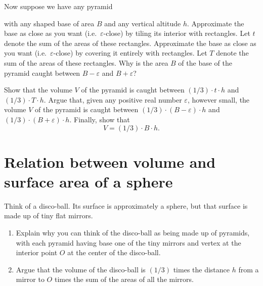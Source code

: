 \documentclass[newpage,hints,handout]{ximera}
\begin{document}
Now suppose we have any pyramid%
\begin{image}
\end{image}
with any shaped base of area $B$ and any vertical altitude $h$. Approximate
the base as close as you want (i.e.\ $\varepsilon$-close) by tiling its interior
with rectangles. Let $t$ denote the sum of the areas of these rectangles.
Approximate the base as close as you want (i.e.\ $\varepsilon$-close) by
covering it entirely with rectangles. Let $T$ denote the sum of the areas of
these rectangles. Why is the area $B$ of the base of the pyramid caught
between $B-\varepsilon$ and $B+\varepsilon$?

\begin{problem}
Show that the volume $V$ of the pyramid is caught between $\left(
1/3\right) \cdot t\cdot h$ and $\left( 1/3\right) \cdot T\cdot
h$. Argue that, given any positive real number $\varepsilon$, however
small, the volume $V$ of the pyramid is caught between $\left(
1/3\right) \cdot \left( B-\varepsilon\right)\cdot h$ and $\left(
1/3\right) \cdot \left( B+\varepsilon\right) \cdot h$. Finally, show that
\[
V=\left(  1/3\right)  \cdot B\cdot h.
\]
\end{problem}

\section{Relation between volume and surface area of a sphere}

Think of a disco-ball. Its surface is approximately a sphere, but that
surface is made up of tiny flat mirrors.

\begin{problem}\hfil
\begin{enumerate}
\item Explain why you can think of the disco-ball as being made up of
  pyramids, with each pyramid having base one of the tiny mirrors and
  vertex at the interior point $O$ at the center of the disco-ball.
\item Argue that the volume of the disco-ball is $\left( 1/3\right) $
  times the distance $h$ from a mirror to $O$ times the sum of the
  areas of all the mirrors.
\end{enumerate}
\end{problem}
\end{document}
